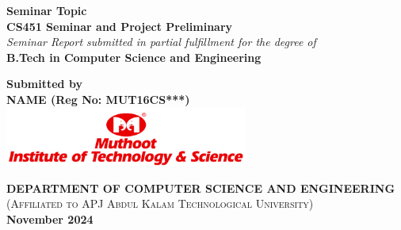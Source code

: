 \documentclass[a4paper,12pt]{template} %
\begin{document}
\begin{titlepage}
    \centering
    \vspace*{2cm}
    {\Huge \textbf{Seminar Topic}}\\[0.5cm]
    {\Large \textbf{CS451 Seminar and Project Preliminary}}\\[1cm]
    
    \textit{Seminar Report submitted in partial fulfillment for the degree of}\\
    {\Large \textbf{B.Tech in Computer Science and Engineering}}\\[1cm]
    
    \vfill
    
    {\Large \textbf{Submitted by}}\\
    {\Large \textbf{NAME (Reg No: MUT16CS***)}}\\[1cm]
    
    \includegraphics[width=0.6\textwidth]{mits.jpg}
    \vspace{0.5cm}
    
    {\Large \textbf{DEPARTMENT OF COMPUTER SCIENCE AND ENGINEERING}}\\[0.5cm]
    \small\textsc{(Affiliated to APJ Abdul Kalam Technological University)}\\[0.3cm]
    
    {\large \textbf{November 2024}}
\end{titlepage}
\end{document}
